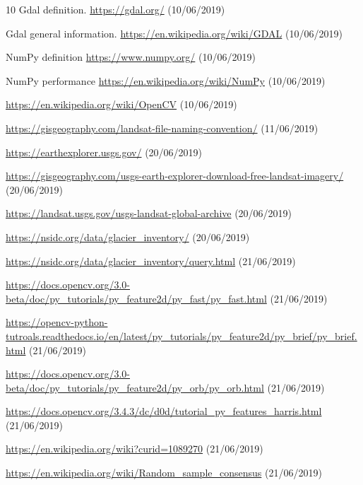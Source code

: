 \documentclass[12pt, a4paper]{report}
\begin{document}
\begin{thebibliography} {10}
				 Gdal definition.
				\url{https://gdal.org/}
				(10/06/2019)
				
				 Gdal general information.
				\url{https://en.wikipedia.org/wiki/GDAL}
				(10/06/2019)
				
				 NumPy definition
				\url{https://www.numpy.org/}
				(10/06/2019)
				
				 NumPy performance
				\url{https://en.wikipedia.org/wiki/NumPy}
				(10/06/2019)
				
				\url{https://en.wikipedia.org/wiki/OpenCV}
				(10/06/2019)
				
				\url{https://gisgeography.com/landsat-file-naming-convention/}
				(11/06/2019)
				
				\url{https://earthexplorer.usgs.gov/}
				(20/06/2019)
				
				\url{https://gisgeography.com/usgs-earth-explorer-download-free-landsat-imagery/}
				(20/06/2019)
				
				\url{https://landsat.usgs.gov/usgs-landsat-global-archive}
				(20/06/2019)
				
				\url{https://nsidc.org/data/glacier_inventory/}
				(20/06/2019)
				
				\url{https://nsidc.org/data/glacier_inventory/query.html}
				(21/06/2019)
				
				\url{https://docs.opencv.org/3.0-beta/doc/py_tutorials/py_feature2d/py_fast/py_fast.html}
				(21/06/2019)
				
				\url{https://opencv-python-tutroals.readthedocs.io/en/latest/py_tutorials/py_feature2d/py_brief/py_brief.html}
				(21/06/2019)
				
				\url{https://docs.opencv.org/3.0-beta/doc/py_tutorials/py_feature2d/py_orb/py_orb.html}
				(21/06/2019)
				
				\url{https://docs.opencv.org/3.4.3/dc/d0d/tutorial_py_features_harris.html}
				(21/06/2019)
				
				\url{https://en.wikipedia.org/wiki?curid=1089270}
				(21/06/2019)
				
				\url{https://en.wikipedia.org/wiki/Random_sample_consensus}
				(21/06/2019)
				

\end{thebibliography}
\end{document}
